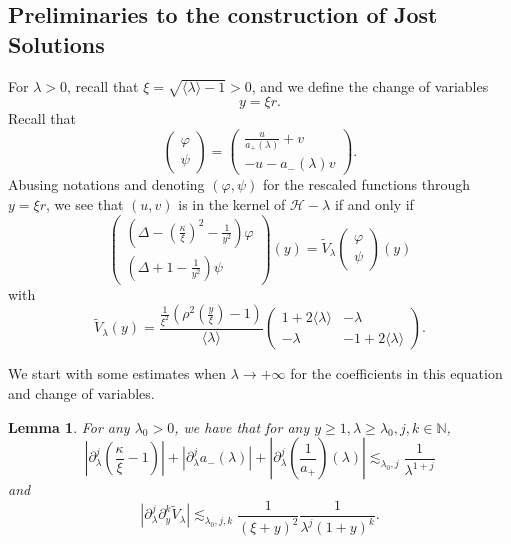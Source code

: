 \documentclass[11 pt]{amsart}
\newtheorem{lem}{Lemma}[section]
\theoremstyle{definition}
\theoremstyle{remark}
\numberwithin{equation}{section}
\begin{document}
\subsection{Preliminaries to the construction of Jost Solutions}\label{dropdown}

For $\lambda > 0$, recall that $\xi = \sqrt{\langle \lambda \rangle - 1} >
0$, and we define the change of variables
\[ y = \xi r. \]
Recall that
\[ \left(\begin{array}{c}
     \varphi\\
     \psi
   \end{array}\right) = \left(\begin{array}{c}
     \frac{u}{a_+ (\lambda)} + v\\
     - u - a_- (\lambda) v
   \end{array}\right) . \]
Abusing notations and denoting $(\varphi,\psi)$ for the rescaled functions through $ y = \xi r$, we see that $(u,v)$ is in the kernel of $\mathcal{H}-\lambda$ if and only if
\begin{equation}
  \left(\begin{array}{c}
    \left( \Delta - \left( \frac{\kappa}{\xi} \right)^2 -
    \frac{1}{y^2} \right) \varphi\\
    \left( \Delta + 1 - \frac{1}{y^2} \right) \psi
  \end{array}\right) (y) = \widetilde{V}_{\lambda} \left(\begin{array}{c}
    \varphi\\
    \psi
  \end{array}\right) (y) \label{lydmor}
\end{equation}
with
\begin{equation}
  \widetilde{V}_{\lambda} (y) =  \frac{\frac{1}{\xi^2} \left( \rho^2
  \left( \frac{y}{\xi} \right) - 1 \right)}{\langle \lambda \rangle}
  \left(\begin{array}{cc}
    1 + 2 \langle \lambda \rangle & - \lambda\\
    - \lambda & - 1 + 2 \langle \lambda \rangle
  \end{array}\right) . \label{aname}
\end{equation}

We start with some estimates when $\lambda \rightarrow + \infty$ for the coefficients in this equation and change of variables.

\begin{lem}
  \label{foryou} For any $\lambda_0 > 0$, we have that for any $y \geqslant 1,
  \lambda \geqslant \lambda_0, j, k \in \mathbb{N}$,
  \[ \left| \partial_{\lambda}^j \left( \frac{\kappa}{\xi} - 1
     \right) \right| + | \partial_{\lambda}^j a_- (\lambda) | + \left|
     \partial_{\lambda}^j \left( \frac{1}{a_+} \right) (\lambda) \right|
     \lesssim_{\lambda_0, j} \frac{1}{\lambda^{1 + j}} \]
  and
  \[ | \partial_{\lambda}^j \partial_y^k \widetilde{V}_{\lambda} |
     \lesssim_{\lambda_0, j, k} \frac{1}{(\xi + y)^2} \frac{1}{\lambda^j
     (1 + y)^k} . \]
\end{lem}
\end{document}
